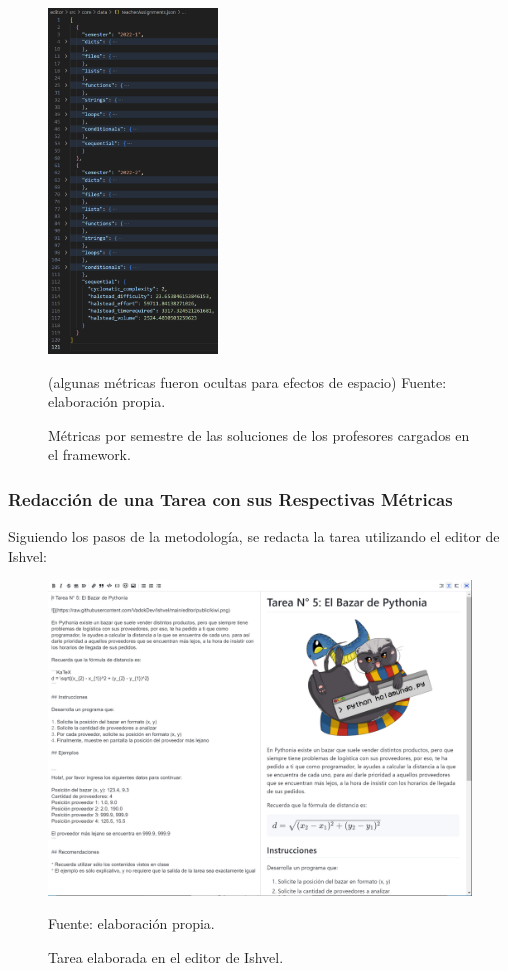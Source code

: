 \documentclass[letterpaper,12pt]{article}
\begin{document}
\begin{figure}[H]
  \centering
  \includegraphics[width=0.4\textwidth]{figures/teacherMetrics1.png}
  \caption{Métricas por semestre de las soluciones de los profesores cargados en el framework.} (algunas métricas fueron ocultas para efectos de espacio) Fuente: elaboración propia.
  \label{img:teacherMetrics1}
\end{figure}

\subsubsection{Redacción de una Tarea con sus Respectivas Métricas}

Siguiendo los pasos de la metodología, se redacta la tarea utilizando el editor de Ishvel:

\begin{figure}[H]
  \centering
  \includegraphics[width=1\textwidth]{figures/ishvel3.png}
  \caption{Tarea elaborada en el editor de Ishvel.} Fuente: elaboración propia.
  \label{img:ishvel8}
\end{figure}
\end{document}
